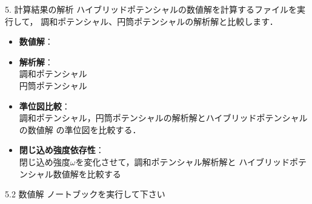 \documentclass{beamer}
\begin{document}
\begin{frame}{5. 計算結果の解析}
ハイブリッドポテンシャルの数値解を計算するファイルを実行して，
調和ポテンシャル、円筒ポテンシャルの解析解と比較します．


  \begin{itemize}
    \item \textbf{数値解}：  \\
    \item \textbf{解析解}：  \\
    \rightarrow 調和ポテンシャル \\
    \rightarrow 円筒ポテンシャル 
    \item \textbf{準位図比較}：  \\
    \rightarrow 調和ポテンシャル，円筒ポテンシャルの解析解とハイブリッドポテンシャルの数値解
    の準位図を比較する．
    \item \textbf{閉じ込め強度依存性}：  \\
    \rightarrow 閉じ込め強度$\omega$を変化させて，調和ポテンシャル解析解と
    ハイブリッドポテンシャル数値解を比較する
  \end{itemize}
\end{frame}

\begin{frame}{5.2 数値解}
  ノートブックを実行して下さい
\end{frame} 
\end{document}
